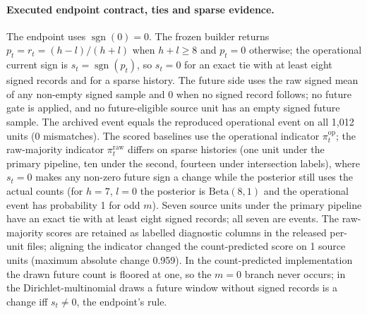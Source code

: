 \documentclass[11pt]{article}
\newcommand{\sgn}{\operatorname{sgn}}
\begin{document}
\paragraph{Executed endpoint contract, ties and sparse evidence.} The endpoint uses $\sgn(0)=0$.
The frozen builder returns $p_t=r_t=(h-l)/(h+l)$ when $h+l\ge8$ and $p_t=0$ otherwise; the
operational current sign is $s_t=\sgn(p_t)$, so $s_t=0$ for an exact tie with at least eight
signed records and for a sparse history. The future side uses the raw signed mean of any
non-empty signed sample and 0 when no signed record follows; no future gate is applied, and no
future-eligible source unit has an empty signed future sample. The archived event equals the
reproduced operational event on all 1{,}012 units (0 mismatches). The scored
baselines use the operational indicator $\pi^{\mathrm{op}}_t$; the raw-majority indicator
$\pi^{\mathrm{raw}}_t$ differs on sparse histories (one unit under the primary pipeline, ten under
the second, fourteen under intersection labels), where $s_t=0$ makes any non-zero future sign a change while
the posterior still uses the actual counts (for $h=7$, $l=0$ the posterior is $\mathrm{Beta}(8,1)$
and the operational event has probability 1 for odd $m$). Seven source units under the primary
pipeline have an exact tie with at least eight signed records; all seven are events. The
raw-majority scores are retained as labelled diagnostic columns in the released per-unit files;
aligning the indicator changed the count-predicted score on 1 source units
(maximum absolute change 0.959). In the count-predicted implementation the drawn future
count is floored at one, so the $m=0$ branch never occurs; in the Dirichlet-multinomial draws a
future window without signed records is a change iff $s_t\ne0$, the endpoint's rule.
\end{document}
